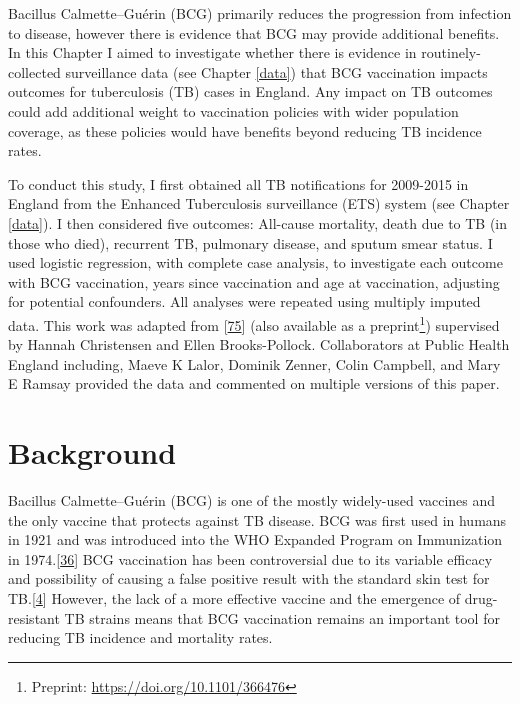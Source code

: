 \documentclass[11pt,twoside]{bristolthesis}
\begin{document}
  Bacillus Calmette--Guérin (BCG) primarily reduces the progression from infection to disease, however there is evidence that BCG may provide additional benefits. In this Chapter I aimed to investigate whether there is evidence in routinely-collected surveillance data (see Chapter \ref{data}) that BCG vaccination impacts outcomes for tuberculosis (TB) cases in England. Any impact on TB outcomes could add additional weight to vaccination policies with wider population coverage, as these policies would have benefits beyond reducing TB incidence rates.
  
  To conduct this study, I first obtained all TB notifications for 2009-2015 in England from the Enhanced Tuberculosis surveillance (ETS) system (see Chapter \ref{data}). I then considered five outcomes: All-cause mortality, death due to TB (in those who died), recurrent TB, pulmonary disease, and sputum smear status. I used logistic regression, with complete case analysis, to investigate each outcome with BCG vaccination, years since vaccination and age at vaccination, adjusting for potential confounders. All analyses were repeated using multiply imputed data. This work was adapted from {[}\protect\hyperlink{ref-Abbott:2019ir}{75}{]} (also available as a preprint\footnote{Preprint: \url{https://doi.org/10.1101/366476}}) supervised by Hannah Christensen and Ellen Brooks-Pollock. Collaborators at Public Health England including, Maeve K Lalor, Dominik Zenner, Colin Campbell, and Mary E Ramsay provided the data and commented on multiple versions of this paper.
  
  \hypertarget{background-4}{%
  \section{Background}\label{background-4}}
  
  Bacillus Calmette--Guérin (BCG) is one of the mostly widely-used vaccines and the only vaccine that protects against TB disease. BCG was first used in humans in 1921 and was introduced into the WHO Expanded Program on Immunization in 1974.{[}\protect\hyperlink{ref-The2004}{36}{]} BCG vaccination has been controversial due to its variable efficacy and possibility of causing a false positive result with the standard skin test for TB.{[}\protect\hyperlink{ref-Zwerling2011a}{4}{]} However, the lack of a more effective vaccine and the emergence of drug-resistant TB strains means that BCG vaccination remains an important tool for reducing TB incidence and mortality rates.
  
\end{document}
